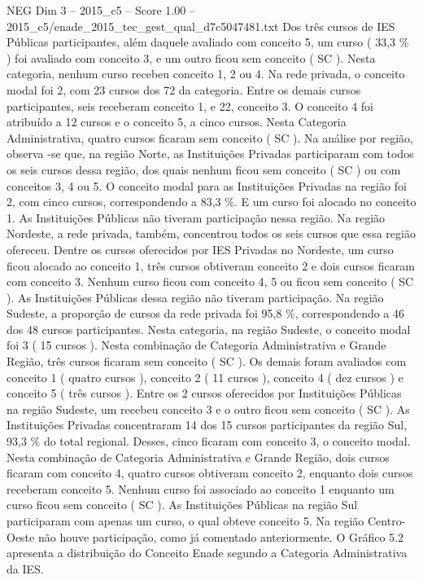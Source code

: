 \begin{textsample}{NEG Dim 3 – 2015\_c5 – Score 1.00 – 2015\_c5/enade\_2015\_tec\_gest\_qual\_d7c5047481.txt}
Dos três cursos de IES Públicas participantes, além daquele avaliado com conceito 5, um curso ( 33,3 \% ) foi avaliado com conceito 3, e um outro ficou sem conceito ( SC ).
Nesta categoria, nenhum curso recebeu conceito 1, 2 ou 4.
Na rede privada, o conceito modal foi 2, com 23 cursos dos 72 da categoria.
Entre os demais cursos participantes, seis receberam conceito 1, e 22, conceito 3.
O conceito 4 foi atribuído a 12 cursos e o conceito 5, a cinco cursos.
Nesta Categoria Administrativa, quatro cursos ficaram sem conceito ( SC ).
Na análise por região, observa -se que, na região Norte, as Instituições Privadas participaram com todos os seis cursos dessa região, dos quais nenhum ficou sem conceito ( SC ) ou com conceitos 3, 4 ou 5.
O conceito modal para as Instituições Privadas na região foi 2, com cinco cursos, correspondendo a 83,3 \%.
E um curso foi alocado no conceito 1.
As Instituições Públicas não tiveram participação nessa região.
Na região Nordeste, a rede privada, também, concentrou todos os seis cursos que essa região ofereceu.
Dentre os cursos oferecidos por IES Privadas no Nordeste, um curso ficou alocado ao conceito 1, três cursos obtiveram conceito 2 e dois cursos ficaram com conceito 3.
Nenhum curso ficou com conceito 4, 5 ou ficou sem conceito ( SC ).
As Instituições Públicas dessa região não tiveram participação.
Na região Sudeste, a proporção de cursos da rede privada foi 95,8 \%, correspondendo a 46 dos 48 cursos participantes.
Nesta categoria, na região Sudeste, o conceito modal foi 3 ( 15 cursos ).
Nesta combinação de Categoria Administrativa e Grande Região, três cursos ficaram sem conceito ( SC ).
Os demais foram avaliados com conceito 1 ( quatro cursos ), conceito 2 ( 11 cursos ), conceito 4 ( dez cursos ) e conceito 5 ( três cursos ).
Entre os 2 cursos oferecidos por Instituições Públicas na região Sudeste, um recebeu conceito 3 e o outro ficou sem conceito ( SC ).
As Instituições Privadas concentraram 14 dos 15 cursos participantes da região Sul, 93,3 \% do total regional.
Desses, cinco ficaram com conceito 3, o conceito modal.
Nesta combinação de Categoria Administrativa e Grande Região, dois cursos ficaram com conceito 4, quatro cursos obtiveram conceito 2, enquanto dois cursos receberam conceito 5.
Nenhum curso foi associado ao conceito 1 enquanto um curso ficou sem conceito ( SC ).
As Instituições Públicas na região Sul participaram com apenas um curso, o qual obteve conceito 5.
Na região Centro-Oeste não houve participação, como já comentado anteriormente.
O Gráfico 5.2 apresenta a distribuição do Conceito Enade segundo a Categoria Administrativa da IES.

\end{textsample}
